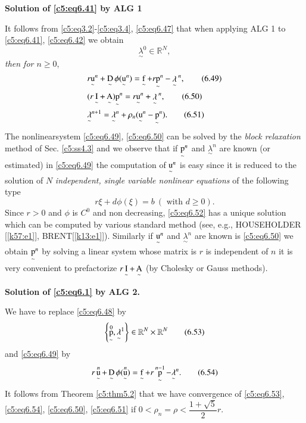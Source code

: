 \noindent
\textbf{Solution of \eqref{c5:eq6.41} by ALG 1}

It follows from \eqref{c5:eq3.2}-\eqref{c5:eq3.4}, \eqref{c5:eq6.47} 
that when applying ALG 1 to \eqref{c5:eq6.41}, \eqref{c5:eq6.42} we 
obtain   
 \begin{equation}
\underset{\sim}\lambda^0 \in \mathbb{R}^N, \tag{6.48}\label{c5:eq6.48}
 \end{equation} 
 \textit{then for $n \geq 0$},
 \begin{align*}
&r {\operatorname*{u}\limits_\sim}^n + \operatorname*{D}\limits_\sim \phi ({\operatorname*{u}\limits_\sim}^n ) = 
\operatorname*{f}\limits_\sim + r {\operatorname*{p}\limits_\sim}^n -\mathop{\lambda}_\sim {}^n, 
\tag{6.49}\label{c5:eq6.49}\\  
&( r\operatorname*{I}\limits_\sim + \operatorname*{A}\limits_\sim ) {\operatorname*{p}\limits_\sim}^n = r 
{\operatorname*{u}\limits_\sim}^n + \mathop{\lambda}_\sim {}^n, 
\tag{6.50}\label{c5:eq6.50}\\  
&\underset{\sim}\lambda^{n+1} = \underset{\sim}\lambda^n + \rho_n 
({\operatorname*{u}\limits_\sim}^n - {\operatorname*{p}\limits_\sim}^n ). \tag{6.51}\label{c5:eq6.51}   
 \end{align*} 
The nonlinear\pageoriginale   system \eqref{c5:eq6.49}, \eqref{c5:eq6.50} can be solved 
by the \textit{block relaxation} method of Sec. \ref{c5:ss4.3} and we 
observe that if ${\operatorname*{p}\limits_\sim}^n$ and $\underset{\sim}\lambda^n$ are 
known (or estimated) in \eqref{c5:eq6.49} the computation of 
${\operatorname*{u}\limits_\sim}^n$  is easy since it is reduced to the solution of $N$ 
\textit{independent, single variable nonlinear equations} of the 
following type      
\begin{equation}
r \xi + d \phi (\xi ) = b ~(\text{ with }d \geq 0). \tag{6.52}\label{c5:eq6.52}
\end{equation}
Since $r >0$ and $\phi$ is $C^0$  and non decreasing,
\eqref{c5:eq6.52} has  a unique solution which can be computed by
various standard method (see, e.g.,  HOUSEHOLDER [\ref{k57:e1}],
BRENT[\ref{k13:e1}]).
Similarly if ${\operatorname*{u}\limits_\sim}^n$ and $\underset{\sim}\lambda^n$ are
known is \eqref{c5:eq6.50} we obtain ${\operatorname*{p}\limits_\sim}^n$ by solving a
linear system whose matrix is $r$ is independent of $n$ it is very
convenient to prefactorize $r \operatorname*{I}\limits_\sim + \operatorname*{A}\limits_\sim$ (by
Cholesky or Gauss methods).  

\noindent \textbf{Solution of \eqref{c5:eq6.1} by ALG 2.}

We have to replace \eqref{c5:eq6.48} by 
\begin{equation}
\left\{ \operatorname*{p}\limits_\sim^0, \underset{\sim}\lambda^1 \right\} \in
\mathbb{R}^N \times \mathbb{R}^N \tag{6.53}\label{c5:eq6.53} 
\end{equation} 
and \eqref{c5:eq6.49} by
\begin{equation}
r \operatorname*{u}\limits_\sim^n + \operatorname*{D}\limits_\sim \phi (\operatorname*{u}\limits_\sim^n ) = \operatorname*{f} 
\limits_\sim + r \operatorname*{p}\limits_\sim^{n-1} - \underset{\sim}\lambda^n. 
\tag{6.54}\label{c5:eq6.54}  
 \end{equation} 
It follows from Theorem \ref{c5:thm5.2} that we have convergence of 
\eqref{c5:eq6.53}, \eqref{c5:eq6.54}, \eqref{c5:eq6.50}, 
\eqref{c5:eq6.51} if $0   
< \rho_n = \rho <\dfrac{1 + \sqrt{5}}{2}r$. 

